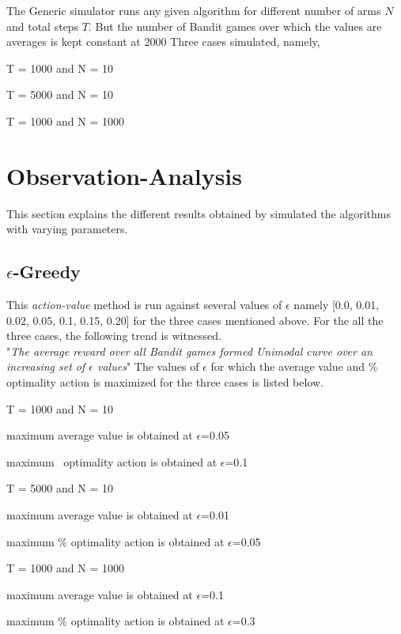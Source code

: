 \documentclass[a4paper,10pt]{report}
\newenvironment{my_itemize}{
\begin{itemize}
  \setlength{\itemsep}{1pt}
  \setlength{\parskip}{0pt}
  \setlength{\parsep}{0pt}}{
\end{itemize}}
\begin{document}
The Generic simulator runs any given algorithm for different number of arms $N$ and total steps $T$. But the number of Bandit games over which the values are averages is kept constant at 2000 Three cases simulated, namely,
\begin{my_itemize}
\item T = 1000 and N = 10
\item T = 5000 and N = 10
\item T = 1000 and N = 1000
\end{my_itemize}
\pagebreak
\section{Observation-Analysis}
This section explains the different results obtained by simulated the algorithms with varying parameters.
\subsection{$\epsilon$-Greedy}
This \emph{action-value} method is run against several values of $\epsilon$ namely [0.0, 0.01, 0.02, 0.05, 0.1, 0.15, 0.20] for the three cases mentioned above.
For the all the three cases, the following trend is witnessed.\\
"\emph{The average reward over all Bandit games formed Unimodal curve over an increasing set of $\epsilon$ values}"
The values of $\epsilon$ for which the average value and \% optimality action is maximized for the three cases is listed below.

\begin{my_itemize}
\item T = 1000 and N = 10
	\begin{my_itemize}
		\item maximum average value is obtained at $\epsilon$=0.05
		\item maximum \ optimality action is obtained at $\epsilon$=0.1
	\end{my_itemize}
\item T = 5000 and N = 10
	\begin{my_itemize}
		\item maximum average value is obtained at $\epsilon$=0.01
		\item maximum \% optimality action is obtained at $\epsilon$=0.05
	\end{my_itemize}
\item T = 1000 and N = 1000
	\begin{my_itemize}
		\item maximum average value is obtained at $\epsilon$=0.1
		\item maximum \% optimality action is obtained at $\epsilon$=0.3
	\end{my_itemize}
\end{my_itemize}
\end{document}
